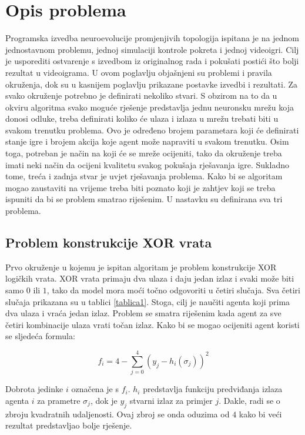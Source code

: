 \documentclass[times, utf8, diplomski, numeric]{fer}
\begin{document}
\chapter{Opis problema}
Programska izvedba neuroevolucije promjenjivih topologija ispitana je na jednom jednostavnom problemu, jednoj simulaciji kontrole pokreta i jednoj videoigri. Cilj je usporediti ostvarenje s izvedbom iz originalnog rada \citep{rad5} i pokušati postići što bolji rezultat u videoigrama. U ovom poglavlju objašnjeni su problemi i pravila okruženja, dok su u kasnijem poglavlju prikazane postavke izvedbi i rezultati. Za svako okruženje potrebno je definirati nekoliko stvari. 
S obzirom na to da u okviru algoritma svako moguće rješenje predstavlja jednu neuronsku mrežu koja donosi odluke, treba definirati koliko će ulaza i izlaza u mrežu trebati biti u svakom trenutku problema. Ovo je određeno brojem parametara koji će definirati stanje igre i brojem akcija koje agent može napraviti u svakom trenutku. Osim toga, potreban je način na koji će se mreže ocijeniti, tako da okruženje treba imati neki način da ocijeni kvalitetu svakog pokušaja rješavanja igre. Sukladno tome, treća i zadnja stvar je uvjet rješavanja problema. Kako bi se algoritam mogao zaustaviti na vrijeme treba biti poznato koji je zahtjev koji se treba ispuniti da bi se problem smatrao riješenim. U nastavku su definirana sva tri problema.

\section{Problem konstrukcije XOR vrata}
Prvo okruženje u kojemu je ispitan algoritam je problem konstrukcije XOR logičkih vrata. XOR vrata primaju dva ulaza i daju jedan izlaz i svaki može biti samo $0$ ili $1$, tako da model mora moći točno odgovoriti u četiri slučaja. Sva četiri slučaja prikazana su u tablici \ref{tablica1}. Stoga, cilj je naučiti agenta koji prima dva ulaza i vraća jedan izlaz. Problem se smatra riješenim kada agent za sve četiri kombinacije ulaza vrati točan izlaz. Kako bi se mogao ocijeniti agent koristi se sljedeća formula:

\begin{equation}
f_i = 4 - \sum_{j=0}^4 (y_j - h_i(\sigma_j))^2
\label{jednakost3}
\end{equation}

Dobrota jedinke $i$ označena je s $f_i$. $h_i$ predstavlja funkciju predviđanja izlaza agenta $i$ za prametre $\sigma_j$, dok je $y_j$ stvarni izlaz za primjer $j$. Dakle, radi se o zbroju kvadratnih udaljenosti. Ovaj zbroj se onda oduzima od $4$ kako bi veći rezultat predstavljao bolje rješenje.
\end{document}
